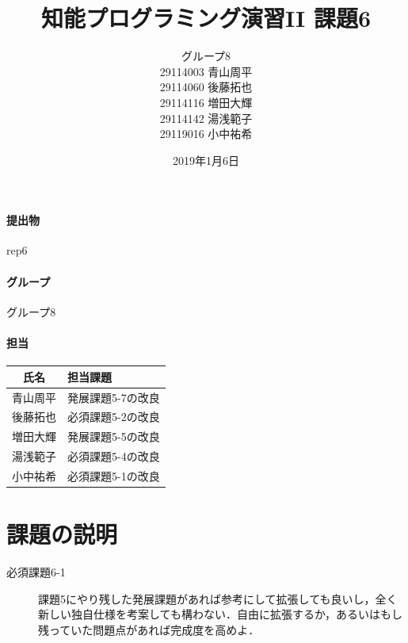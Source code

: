 \documentclass[12pt]{jarticle}
\title{知能プログラミング演習II 課題6}
\author{グループ8\\
  29114003 青山周平\\
  29114060 後藤拓也\\
  29114116 増田大輝\\
  29114142 湯浅範子\\
  29119016 小中祐希\\
}
\date{2019年1月6日}
\begin{document}
\maketitle

\paragraph{提出物} rep6
\paragraph{グループ} グループ8

\paragraph{担当}
\begin{tabular}{|c|l|}
  \hline
  氏名&担当課題\\
  \hline\hline
  青山周平&発展課題5-7の改良\\
  \hline
  後藤拓也&必須課題5-2の改良\\
  \hline
  増田大輝&発展課題5-5の改良\\
  \hline
  湯浅範子&必須課題5-4の改良\\
  \hline
  小中祐希&必須課題5-1の改良\\
  \hline
\end{tabular}

\section{課題の説明}
\begin{description}
\item[必須課題6-1] 課題5にやり残した発展課題があれば参考にして拡張しても良いし，全く新しい独自仕様を考案しても構わない．自由に拡張するか，あるいはもし残っていた問題点があれば完成度を高めよ．
\end{description}
\end{document}
